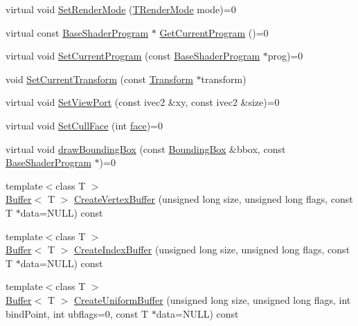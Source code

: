 \begin{DoxyCompactItemize}
\item 
virtual void \hyperlink{class_agmd_1_1_driver_a6edc110be95fa6c2922a13ce025d8aa4}{Set\+Render\+Mode} (\hyperlink{namespace_agmd_aa4cbd15e55e815e187c31a8f435addae}{T\+Render\+Mode} mode)=0
\item 
virtual const \hyperlink{class_agmd_1_1_base_shader_program}{Base\+Shader\+Program} $\ast$ \hyperlink{class_agmd_1_1_driver_a2b14b7ecb1a8533e2b4e80d88fc95656}{Get\+Current\+Program} ()=0
\item 
virtual void \hyperlink{class_agmd_1_1_driver_ac6d8e0a25e5bac4591731a006338eeb3}{Set\+Current\+Program} (const \hyperlink{class_agmd_1_1_base_shader_program}{Base\+Shader\+Program} $\ast$prog)=0
\item 
void \hyperlink{class_agmd_1_1_driver_a5d026607f63acff5dd9c14cc86ec1142}{Set\+Current\+Transform} (const \hyperlink{class_agmd_maths_1_1_transform}{Transform} $\ast$transform)
\item 
virtual void \hyperlink{class_agmd_1_1_driver_ab16bec32bad282876e909ee90df11be7}{Set\+View\+Port} (const ivec2 \&xy, const ivec2 \&size)=0
\item 
virtual void \hyperlink{class_agmd_1_1_driver_a9c44dbdfe6cd21a69bd0e2557f07d95e}{Set\+Cull\+Face} (int \hyperlink{_planet_8cpp_ae1161f79bdbe47164b23549af2139d25}{face})=0
\item 
virtual void \hyperlink{class_agmd_1_1_driver_aa70ae0f0cb206e314bb35a3b99d49820}{draw\+Bounding\+Box} (const \hyperlink{class_agmd_1_1_bounding_box}{Bounding\+Box} \&bbox, const \hyperlink{class_agmd_1_1_base_shader_program}{Base\+Shader\+Program} $\ast$)=0
\item 
{\footnotesize template$<$class T $>$ }\\\hyperlink{class_agmd_1_1_buffer}{Buffer}$<$ T $>$ \hyperlink{class_agmd_1_1_driver_aeb0311aeb0121cf0ea859cc7f67213df}{Create\+Vertex\+Buffer} (unsigned long size, unsigned long flags, const T $\ast$data=N\+U\+L\+L) const 
\item 
{\footnotesize template$<$class T $>$ }\\\hyperlink{class_agmd_1_1_buffer}{Buffer}$<$ T $>$ \hyperlink{class_agmd_1_1_driver_a73a2d51147230616672aa7a1b4dd48dc}{Create\+Index\+Buffer} (unsigned long size, unsigned long flags, const T $\ast$data=N\+U\+L\+L) const 
\item 
{\footnotesize template$<$class T $>$ }\\\hyperlink{class_agmd_1_1_buffer}{Buffer}$<$ T $>$ \hyperlink{class_agmd_1_1_driver_ab05c55dc5db4066a984665715e35b17a}{Create\+Uniform\+Buffer} (unsigned long size, unsigned long flags, int bind\+Point, int ubflags=0, const T $\ast$data=N\+U\+L\+L) const 

\end{DoxyCompactItemize}
